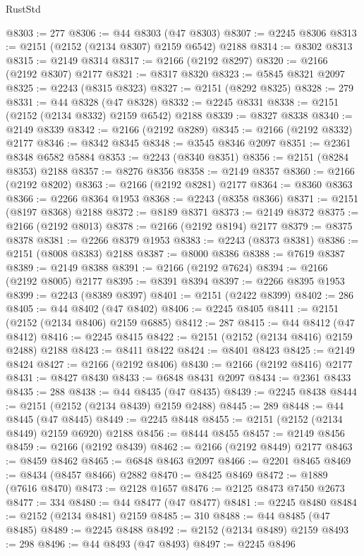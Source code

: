 \begin{lexlean}{RustStd}
\begin{coremodule}
@8303 := 277
@8306 := @44 @8303 (@47 @8303)
@8307 := @2245 @8306
@8313 := @2151 (@2152 (@2134 @8307) @2159 @6542) @2188
@8314 := @8302 @8313
@8315 := @2149 @8314
@8317 := @2166 (@2192 @8297)
@8320 := @2166 (@2192 @8307) @2177
@8321 := @8317 @8320
@8323 := @5845 @8321 @2097
@8325 := @2243 (@8315 @8323)
@8327 := @2151 (@8292 @8325)
@8328 := 279
@8331 := @44 @8328 (@47 @8328)
@8332 := @2245 @8331
@8338 := @2151 (@2152 (@2134 @8332) @2159 @6542) @2188
@8339 := @8327 @8338
@8340 := @2149 @8339
@8342 := @2166 (@2192 @8289)
@8345 := @2166 (@2192 @8332) @2177
@8346 := @8342 @8345
@8348 := @3545 @8346 @2097
@8351 := @2361 @8348 @6582 @5884
@8353 := @2243 (@8340 @8351)
@8356 := @2151 (@8284 @8353) @2188
@8357 := @8276 @8356
@8358 := @2149 @8357
@8360 := @2166 (@2192 @8202)
@8363 := @2166 (@2192 @8281) @2177
@8364 := @8360 @8363
@8366 := @2266 @8364 @1953
@8368 := @2243 (@8358 @8366)
@8371 := @2151 (@8197 @8368) @2188
@8372 := @8189 @8371
@8373 := @2149 @8372
@8375 := @2166 (@2192 @8013)
@8378 := @2166 (@2192 @8194) @2177
@8379 := @8375 @8378
@8381 := @2266 @8379 @1953
@8383 := @2243 (@8373 @8381)
@8386 := @2151 (@8008 @8383) @2188
@8387 := @8000 @8386
@8388 := @7619 @8387
@8389 := @2149 @8388
@8391 := @2166 (@2192 @7624)
@8394 := @2166 (@2192 @8005) @2177
@8395 := @8391 @8394
@8397 := @2266 @8395 @1953
@8399 := @2243 (@8389 @8397)
@8401 := @2151 (@2422 @8399)
@8402 := 286
@8405 := @44 @8402 (@47 @8402)
@8406 := @2245 @8405
@8411 := @2151 (@2152 (@2134 @8406) @2159 @6885)
@8412 := 287
@8415 := @44 @8412 (@47 @8412)
@8416 := @2245 @8415
@8422 := @2151 (@2152 (@2134 @8416) @2159 @2488) @2188
@8423 := @8411 @8422
@8424 := @8401 @8423
@8425 := @2149 @8424
@8427 := @2166 (@2192 @8406)
@8430 := @2166 (@2192 @8416) @2177
@8431 := @8427 @8430
@8433 := @6848 @8431 @2097
@8434 := @2361 @8433
@8435 := 288
@8438 := @44 @8435 (@47 @8435)
@8439 := @2245 @8438
@8444 := @2151 (@2152 (@2134 @8439) @2159 @2488)
@8445 := 289
@8448 := @44 @8445 (@47 @8445)
@8449 := @2245 @8448
@8455 := @2151 (@2152 (@2134 @8449) @2159 @6920) @2188
@8456 := @8444 @8455
@8457 := @2149 @8456
@8459 := @2166 (@2192 @8439)
@8462 := @2166 (@2192 @8449) @2177
@8463 := @8459 @8462
@8465 := @6848 @8463 @2097
@8466 := @2201 @8465
@8469 := @8434 (@8457 @8466) @2882
@8470 := @8425 @8469
@8472 := @1889 (@7616 @8470)
@8473 := @2128 @1657
@8476 := @2125 @8473 @7450 @2673
@8477 := 334
@8480 := @44 @8477 (@47 @8477)
@8481 := @2245 @8480
@8484 := @2152 (@2134 @8481) @2159
@8485 := 310
@8488 := @44 @8485 (@47 @8485)
@8489 := @2245 @8488
@8492 := @2152 (@2134 @8489) @2159
@8493 := 298
@8496 := @44 @8493 (@47 @8493)
@8497 := @2245 @8496

\end{coremodule}
\end{lexlean}
